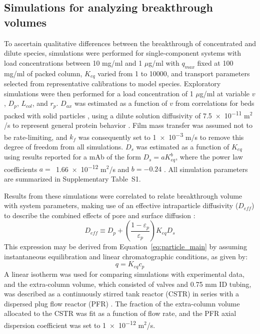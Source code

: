 \documentclass[preprint,review,12pt]{elsarticle}
\begin{document}
    \subsection{Simulations for analyzing breakthrough volumes} \label{ssec:sims_explor}
        To ascertain qualitative differences between the breakthrough of concentrated and dilute species, simulations were performed for single-component systems with load concentrations between 10 mg/ml and 1 $\mu$g/ml with $q_{max}$ fixed at  100 mg/ml of packed column, $K_{eq}$ varied from 1 to 10000, and transport parameters selected from representative calibrations to model species. Exploratory simulations were then performed for a load concentration of 1 $\mu$g/ml at variable $v$, $D_p$, $L_{col}$, and $r_p$. $D_{ax}$ was estimated as a function of $v$ from correlations for beds packed with solid particles \cite{Han1985}, using a dilute solution diffusivity of \num{7.5e-11} m$^2$/s to represent general protein behavior \cite{Young1980}. Film mass transfer was assumed not to be rate-limiting, and $k_f$ was consequently set to \num{1e-3} m/s to remove this degree of freedom from all simulations. $D_s$ was estimated as a function of $K_{eq}$ using results reported for a mAb of the form $D_s = a K_{eq}^b$, where the power law coefficients $a =$~\num{1.66e-12} m$^2$/s and $b = -0.24$ \cite{Khanal7004}. All simulation parameters are summarized in Supplementary Table~S1.


        Results from these simulations were correlated to relate breakthrough volume with system parameters, making use of an effective intraparticle diffusivity ($D_{eff}$) to describe the combined effects of pore and surface diffusion \cite{Yoshida1994}:
        \begin{equation} \label{eq:d_eff}
            D_{eff} \equiv D_p + \left( \frac{1 - \varepsilon_p}{\varepsilon_p} \right) K_{eq} D_s
        \end{equation}
        This expression may be derived from Equation~\ref{eq:particle_main} by assuming instantaneous equilibration and linear chromatographic conditions, as given by:
        \begin{equation} \label{eq:linear_ss}
            q = K_{eq} c_p
        \end{equation}
        A linear isotherm was used for comparing simulations with experimental data, and the extra-column volume, which consisted of valves and 0.75 mm ID tubing, was described as a continuously stirred tank reactor (CSTR) in series with a dispersed plug flow reactor (PFR) \cite{Kumar2015}. The fraction of the extra-column volume allocated to the CSTR was fit as a function of flow rate, and the PFR axial dispersion coefficient was set to \num{1e-12} m$^2$/s.
\end{document}
